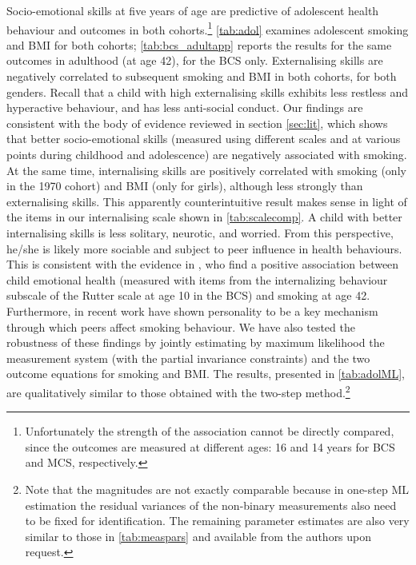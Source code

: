 Socio-emotional skills at five years of age are predictive of adolescent health behaviour and outcomes in both cohorts.\footnote{Unfortunately the strength of the association cannot be directly compared, since the outcomes are measured at different ages: 16 and 14 years for BCS and MCS, respectively.} \autoref{tab:adol} examines adolescent smoking and BMI for both cohorts; \autoref{tab:bcs_adultapp} reports the results for the same outcomes in adulthood (at age 42), for the BCS only. Externalising skills are negatively correlated to subsequent smoking and BMI in both cohorts, for both genders. Recall that a child with high externalising skills exhibits less restless and hyperactive behaviour, and has less anti-social conduct. Our findings are consistent with the body of evidence reviewed in section \ref{sec:lit}, which shows that better socio-emotional skills (measured using different scales and at various points during childhood and adolescence) are negatively associated with smoking. At the same time, internalising skills are positively correlated with smoking (only in the 1970 cohort) and BMI (only for girls), although less strongly than externalising skills. This apparently counterintuitive result makes sense in light of the items in our internalising scale shown in \autoref{tab:scalecomp}. A child with better internalising skills is less solitary, neurotic, and worried. From this perspective, he/she is likely more sociable and subject to peer influence in health behaviours. This is consistent with the evidence in \citet{Goodman2015}, who find a positive association between child emotional health (measured with items from the internalizing behaviour subscale of the Rutter scale at age 10 in the BCS) and smoking at age 42. Furthermore, in recent work \citet{Hsieh2018} have shown personality to be a key mechanism through which peers affect smoking behaviour. We have also tested the robustness of these findings by jointly estimating by maximum likelihood the measurement system (with the partial invariance constraints) and the two outcome equations for smoking and BMI. The results, presented in \autoref{tab:adolML}, are qualitatively similar to those obtained with the two-step method.\footnote{Note that the magnitudes are not exactly comparable because in one-step ML estimation the residual variances of the non-binary measurements also need to be fixed for identification. The remaining parameter estimates are also very similar to those in \autoref{tab:measpars} and available from the authors upon request.}

